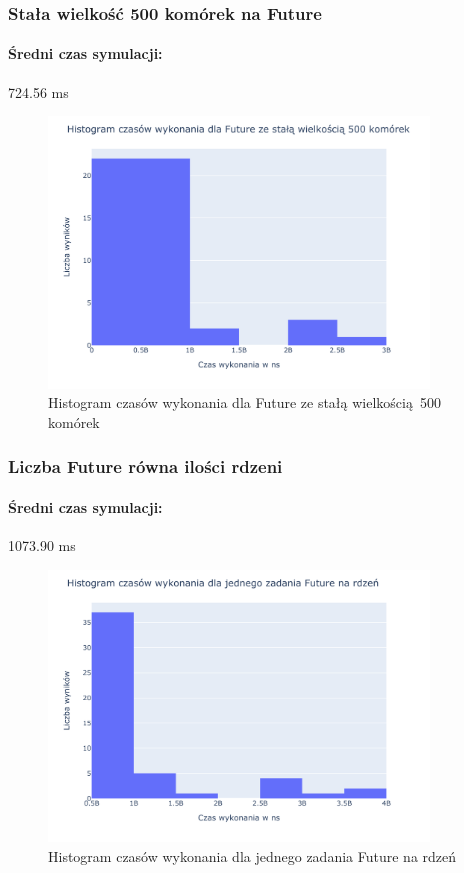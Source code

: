 \documentclass{mwart}
\begin{document}
\subsubsection{Stała wielkość 500 komórek na Future}
\paragraph{Średni czas symulacji: } 724.56 ms


\begin{figure}[H]
  \centering
  \includegraphics[width=0.9\textwidth]{Parallel_Future_fix_chunk_500_game_of_life_performance}
  \caption{Histogram czasów wykonania dla Future ze stałą wielkością 500 komórek}
\end{figure}

\subsubsection{Liczba Future równa ilości rdzeni}
\paragraph{Średni czas symulacji: } 1073.90 ms


\begin{figure}[H]
  \centering
  \includegraphics[width=0.9\textwidth]{Parallel_Future_One_For_Each_Thread_of_life_performance}
  \caption{Histogram czasów wykonania dla jednego zadania Future na rdzeń}
\end{figure}
\end{document}
